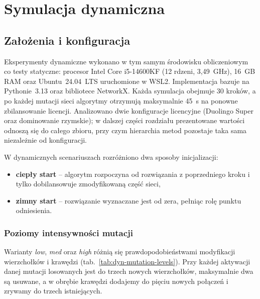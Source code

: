 \chapter{Symulacja dynamiczna}\label{chap:dynamic}

\section{Założenia i konfiguracja}

Eksperymenty dynamiczne wykonano w tym samym środowisku obliczeniowym co testy statyczne: procesor Intel Core i5-14600KF (12 rdzeni, 3,49~GHz), 16~GB RAM oraz Ubuntu~24.04~LTS uruchomione w WSL2. Implementacja bazuje na Pythonie~3.13 oraz bibliotece NetworkX. Każda symulacja obejmuje 30 kroków, a po każdej mutacji sieci algorytmy otrzymują maksymalnie 45~s na ponowne zbilansowanie licencji. Analizowano dwie konfiguracje licencyjne (Duolingo Super oraz dominowanie rzymskie); w dalszej części rozdziału prezentowane wartości odnoszą się do całego zbioru, przy czym hierarchia metod pozostaje taka sama niezależnie od konfiguracji.

W dynamicznych scenariuszach rozróżniono dwa sposoby inicjalizacji:
\begin{itemize}
  \item \textbf{ciepły start} -- algorytm rozpoczyna od rozwiązania z poprzedniego kroku i tylko dobilansowuje zmodyfikowaną część sieci,
  \item \textbf{zimny start} -- rozwiązanie wyznaczane jest od zera, pełniąc rolę punktu odniesienia.
\end{itemize}

\subsection{Poziomy intensywności mutacji}

Warianty \emph{low}, \emph{med} oraz \emph{high} różnią się prawdopodobieństwami modyfikacji wierzchołków i krawędzi (tab.~\ref{tab:dyn-mutation-levels}). Przy każdej aktywacji danej mutacji losowanych jest do trzech nowych wierzchołków, maksymalnie dwa są usuwane, a w obrębie krawędzi dodajemy do pięciu nowych połączeń i zrywamy do trzech istniejących.

